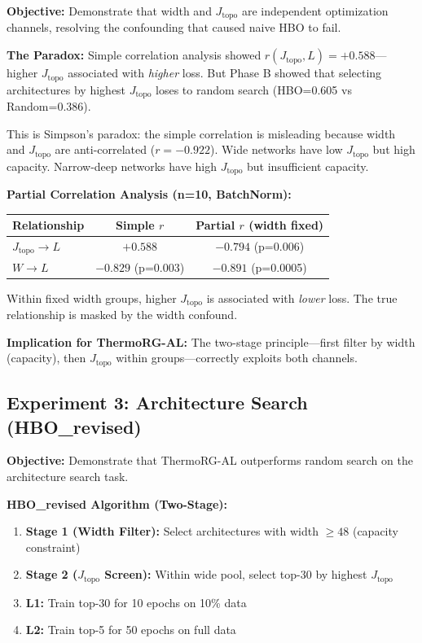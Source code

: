 \documentclass[11pt, a4paper]{article}
\theoremstyle{plain}
\begin{document}
\textbf{Objective:} Demonstrate that width and $J_{\mathrm{topo}}$ are independent optimization channels, resolving the confounding that caused naive HBO to fail.

\textbf{The Paradox:} Simple correlation analysis showed $r(J_{\mathrm{topo}}, L) = +0.588$---higher $J_{\mathrm{topo}}$ associated with \emph{higher} loss. But Phase B showed that selecting architectures by highest $J_{\mathrm{topo}}$ loses to random search (HBO=0.605 vs Random=0.386).

This is Simpson's paradox: the simple correlation is misleading because width and $J_{\mathrm{topo}}$ are anti-correlated ($r = -0.922$). Wide networks have low $J_{\mathrm{topo}}$ but high capacity. Narrow-deep networks have high $J_{\mathrm{topo}}$ but insufficient capacity.

\textbf{Partial Correlation Analysis (n=10, BatchNorm):}

\begin{center}
\begin{tabular}{lcc}
\toprule
Relationship & Simple $r$ & Partial $r$ (width fixed) \\
\midrule
$J_{\mathrm{topo}} \to L$ & $+0.588$ & $\mathbf{-0.794}$ (p=0.006) \\
$W \to L$ & $-0.829$ (p=0.003) & $-0.891$ (p=0.0005) \\
\bottomrule
\end{tabular}
\end{center}

Within fixed width groups, higher $J_{\mathrm{topo}}$ is associated with \emph{lower} loss. The true relationship is masked by the width confound.

\textbf{Implication for ThermoRG-AL:} The two-stage principle---first filter by width (capacity), then $J_{\mathrm{topo}}$ within groups---correctly exploits both channels.

\subsection{Experiment 3: Architecture Search (HBO\_revised)}

\textbf{Objective:} Demonstrate that ThermoRG-AL outperforms random search on the architecture search task.

\textbf{HBO\_revised Algorithm (Two-Stage):}
\begin{enumerate}
\item \textbf{Stage 1 (Width Filter):} Select architectures with width $\geq 48$ (capacity constraint)
\item \textbf{Stage 2 ($J_{\mathrm{topo}}$ Screen):} Within wide pool, select top-30 by highest $J_{\mathrm{topo}}$
\item \textbf{L1:} Train top-30 for 10 epochs on 10\% data
\item \textbf{L2:} Train top-5 for 50 epochs on full data
\end{enumerate}
\end{document}
